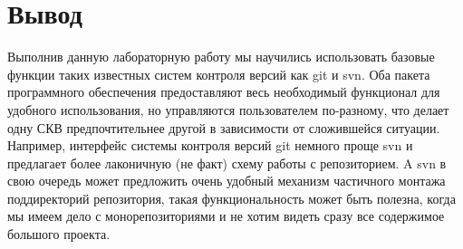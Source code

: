 \documentclass{article}
\begin{document}
\section{Вывод}

Выполнив данную лабораторную работу мы научились 
использовать базовые функции таких известных систем
контроля версий как git и svn. Оба пакета программного
обеспечения предоставляют весь необходимый функционал
для удобного использования, но управляются пользователем
по-разному, что делает одну СКВ предпочтительнее другой
в зависимости от сложившейся ситуации. Например, интерфейс
системы контроля версий git немного проще svn и предлагает
более лаконичную (не факт) схему работы с репозиторием. A 
svn в свою очередь может предложить очень удобный механизм
частичного монтажа поддиректорий репозитория, такая 
функциональность может быть полезна, когда мы имеем дело
с монорепозиториями и не хотим видеть сразу все содержимое
большого проекта.
\end{document}
